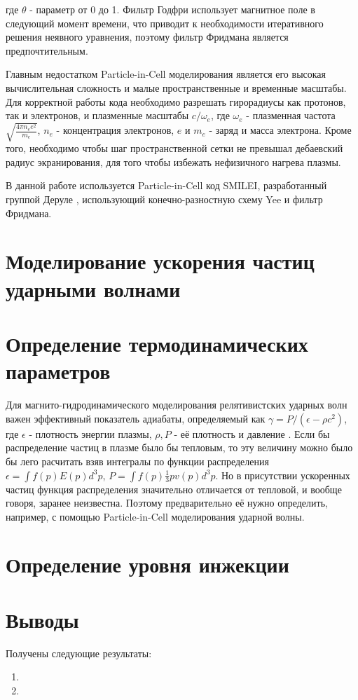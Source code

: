 где $\theta$ - параметр от 0 до 1. Фильтр Годфри использует магнитное поле в следующий момент времени, что приводит к необходимости итеративного решения неявного уравнения, поэтому фильтр Фридмана является предпочтительным.


Главным недостатком Particle-in-Cell моделирования является его высокая вычислительная сложность и малые пространственные и временные масштабы. Для корректной работы кода необходимо разрешать гирорадиусы как протонов, так и электронов, и плазменные масштабы $c/\omega_e$, где $\omega_e$ - плазменная частота $\sqrt{\frac{4\pi n_e e^2}{m_e}}$, $n_e$ - концентрация электронов, $e$ и $m_e$ - заряд и масса электрона. Кроме того, необходимо чтобы шаг пространственной сетки не превышал дебаевский радиус экранирования, для того чтобы избежать нефизичного нагрева плазмы.

В данной работе используется Particle-in-Cell код SMILEI, разработанный группой Деруле \cite{Smilei18}, использующий конечно-разностную схему Yee и фильтр Фридмана.

\section{Моделирование ускорения частиц ударными волнами}

\section{Определение термодинамических параметров}
Для магнито-гидродинамического моделирования релятивистских ударных волн важен эффективный показатель адиабаты, определяемый как $\gamma=P/\left(\epsilon-\rho c^2\right)$, где $\epsilon$ - плотность энергии плазмы, $\rho, P$ - её плотность и давление \cite{Blandford1976}. Если бы распределение частиц в плазме было бы тепловым, то эту величину можно было бы лего расчитать взяв интегралы по функции распределения $\epsilon=\int f(p) E(p) d^3 p$, $P = \int f(p) \frac{1}{3} p v(p) d^3 p$. Но в присутствии ускоренных частиц функция распределения значительно отличается от тепловой, и вообще говоря, заранее неизвестна. Поэтому предварительно её нужно определить, например, с помощью Particle-in-Cell моделирования ударной волны.

\section{Определение уровня инжекции}

\FloatBarrier
\section{Выводы}
 

Получены следующие результаты:
\begin{enumerate}
\item 
\item 
\end{enumerate}


\clearpage
